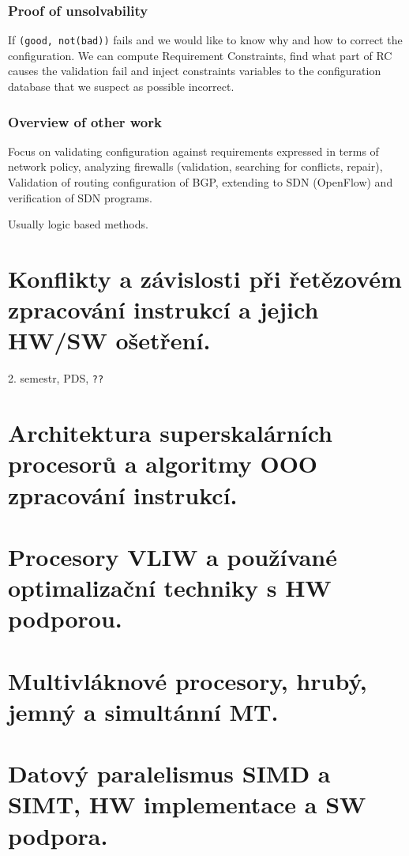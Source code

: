 \documentclass[a4paper, 11pt]{report}
\begin{document}
\subsection{Proof of unsolvability}
If \texttt{(good, not(bad))} fails and we would like to know why and how to correct the configuration.
We can compute Requirement Constraints, find what part of RC causes the validation fail and inject constraints variables to the configuration database that we suspect as possible incorrect.

\subsection{Overview of other work}
Focus on validating configuration against requirements expressed in terms of network policy, analyzing firewalls (validation, searching for conflicts, repair), Validation of routing configuration of BGP, extending to SDN (OpenFlow) and verification of SDN programs.

Usually logic based methods.

\chapter{Konflikty a závislosti při řetězovém zpracování instrukcí a jejich HW/SW ošetření.} \label{cha:44}
2. semestr, PDS, \texttt{??}

\chapter{Architektura superskalárních procesorů a algoritmy OOO zpracování instrukcí.} \label{cha:45}
\chapter{Procesory VLIW a používané optimalizační techniky s HW podporou.} \label{cha:46}
\chapter{Multivláknové procesory, hrubý, jemný a simultánní MT.} \label{cha:47}
\chapter{Datový paralelismus SIMD a SIMT, HW implementace a SW podpora.} \label{cha:48}
\end{document}
